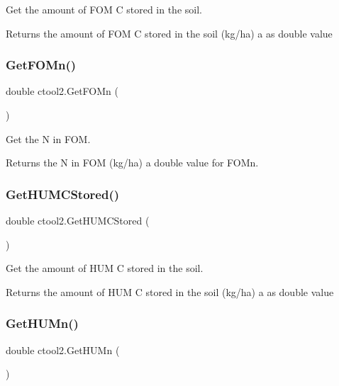 Get the amount of F\+OM C stored in the soil. 

\begin{DoxyReturn}{Returns}
the amount of F\+OM C stored in the soil (kg/ha) a as double value 
\end{DoxyReturn}
\mbox{\label{classctool2_a2b677a56b7667baa7811fef3646d6086}} 
\subsubsection{\texorpdfstring{GetFOMn()}{GetFOMn()}}
{\footnotesize\ttfamily double ctool2.\+Get\+F\+O\+Mn (\begin{DoxyParamCaption}{ }\end{DoxyParamCaption})\hspace{0.3cm}{\ttfamily [inline]}}



Get the N in F\+OM. 

\begin{DoxyReturn}{Returns}
the N in F\+OM (kg/ha) a double value for F\+O\+Mn. 
\end{DoxyReturn}
\mbox{\label{classctool2_af39503c35e1348a77007bb8d52afb436}} 
\subsubsection{\texorpdfstring{GetHUMCStored()}{GetHUMCStored()}}
{\footnotesize\ttfamily double ctool2.\+Get\+H\+U\+M\+C\+Stored (\begin{DoxyParamCaption}{ }\end{DoxyParamCaption})\hspace{0.3cm}{\ttfamily [inline]}}



Get the amount of H\+UM C stored in the soil. 

\begin{DoxyReturn}{Returns}
the amount of H\+UM C stored in the soil (kg/ha) a as double value 
\end{DoxyReturn}
\mbox{\label{classctool2_a4a12ce36b7e85a06e7987e953b08b876}} 
\subsubsection{\texorpdfstring{GetHUMn()}{GetHUMn()}}
{\footnotesize\ttfamily double ctool2.\+Get\+H\+U\+Mn (\begin{DoxyParamCaption}{ }\end{DoxyParamCaption})\hspace{0.3cm}{\ttfamily [inline]}}



